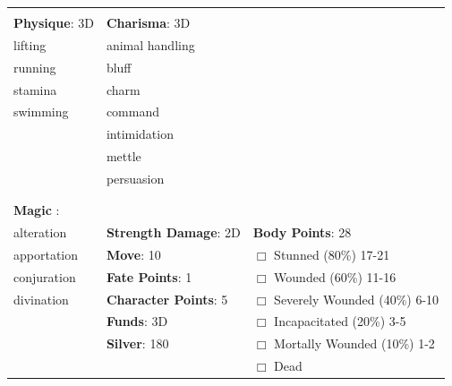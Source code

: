 \documentclass[10pt]{article}
\begin{document}
\begin{table}
\begin{tabular}{m{156pt} m{156pt} m{156pt}}
 \hrulefill &  \hrulefill &  \hrulefill \\


\textbf{Physique}: 3D \hrulefill & \textbf{Charisma}: 3D \hrulefill     &  \hrulefill \\

lifting              \hrulefill & animal handling      \hrulefill &  \hrulefill \\

running              \hrulefill & bluff                \hrulefill &  \hrulefill \\

stamina              \hrulefill & charm                \hrulefill &  \hrulefill \\

swimming             \hrulefill & command              \hrulefill &  \hrulefill \\

 \hrulefill & intimidation         \hrulefill &  \hrulefill \\

 \hrulefill & mettle               \hrulefill &  \hrulefill \\

 \hrulefill & persuasion           \hrulefill &  \hrulefill \\

 \hrulefill &  \hrulefill &  \hrulefill \\

                                  &                                 &                             \\
\textbf{Magic }:  \hrulefill  &                                 &                             \\
alteration           \hrulefill & \textbf{Strength Damage}: 2D \hrulefill                             & \textbf{Body Points}: 28 \hrulefill \\
apportation          \hrulefill                        & \textbf{Move}:             10             \hrulefill    & $\Box$ Stunned \footnotesize{(80\%)} \hfill 17-21 \\
conjuration          \hrulefill                        & \textbf{Fate Points}:      1      \hrulefill    & $\Box$ Wounded \footnotesize{(60\%)} \hfill 11-16 \\
divination           \hrulefill                        & \textbf{Character Points}: 5 \hrulefill    & $\Box$ Severely Wounded \footnotesize{(40\%)} \hfill 6-10 \\
 \hrulefill                        & \textbf{Funds}:            3D            \hrulefill    & $\Box$ Incapacitated \footnotesize{(20\%)} \hfill 3-5 \\
 \hrulefill                        & \textbf{Silver}:           180           \hrulefill    & $\Box$ Mortally Wounded \footnotesize{(10\%)} \hfill 1-2 \\
 \hrulefill                        &  \hrulefill                                                       & $\Box$ Dead   \\
\end{tabular}
\end{table}
\cleardoublepage
\end{document}
